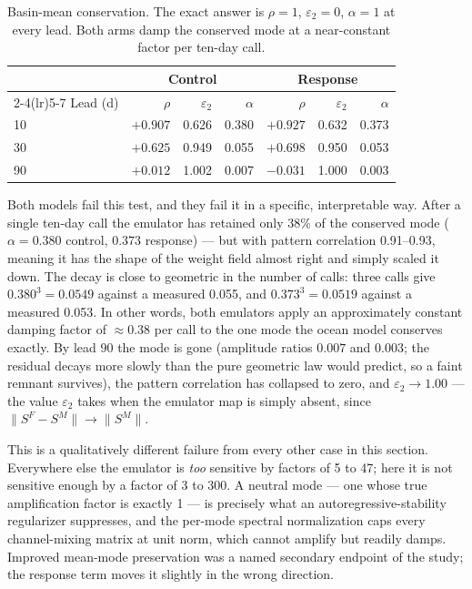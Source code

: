 \documentclass[3p,12pt]{elsarticle}
\begin{document}
\begin{table}[H]
\centering
\small
\begin{tabular}{lrrrrrr}
\toprule
& \multicolumn{3}{c}{Control} & \multicolumn{3}{c}{Response} \\
\cmidrule(lr){2-4}\cmidrule(lr){5-7}
Lead (d) & $\rho$ & $\varepsilon_2$ & $\alpha$ & $\rho$ & $\varepsilon_2$ & $\alpha$ \\
\midrule
10 & $+0.907$ & 0.626 & 0.380 & $+0.927$ & 0.632 & 0.373 \\
30 & $+0.625$ & 0.949 & 0.055 & $+0.698$ & 0.950 & 0.053 \\
90 & $+0.012$ & 1.002 & 0.007 & $-0.031$ & 1.000 & 0.003 \\
\bottomrule
\end{tabular}
\caption{Basin-mean conservation. The exact answer is $\rho=1$,
$\varepsilon_2=0$, $\alpha=1$ at every lead. Both arms damp the conserved mode
at a near-constant factor per ten-day call.}
\label{tab:mean}
\end{table}

Both models fail this test, and they fail it in a specific, interpretable way.
After a single ten-day call the emulator has retained only 38\% of the conserved
mode ($\alpha=0.380$ control, $0.373$ response) --- but with pattern correlation
0.91--0.93, meaning it has the shape of the weight field almost right and simply
scaled it down. The decay is close to geometric in the number of calls: three
calls give $0.380^{3}=0.0549$ against a measured 0.055, and $0.373^{3}=0.0519$
against a measured 0.053. In other words, both emulators apply an approximately
constant damping factor of $\approx0.38$ per call to the one mode the ocean model
conserves exactly. By lead 90 the mode is gone (amplitude ratios $0.007$ and
$0.003$; the residual decays more slowly than the pure geometric law would
predict, so a faint remnant survives), the pattern correlation has collapsed to
zero, and $\varepsilon_2\to1.00$ --- the value $\varepsilon_2$ takes when the
emulator map is simply absent, since $\|S^{F}-S^{M}\|\to\|S^{M}\|$.

This is a qualitatively different failure from every other case in this section.
Everywhere else the emulator is \emph{too} sensitive by factors of 5 to 47; here
it is not sensitive enough by a factor of 3 to 300. A neutral mode --- one whose
true amplification factor is exactly 1 --- is precisely what an
autoregressive-stability regularizer suppresses, and the per-mode spectral
normalization caps every channel-mixing matrix at unit norm, which cannot amplify
but readily damps. Improved mean-mode preservation was a named secondary endpoint
of the study; the response term moves it slightly in the wrong direction.
\end{document}
